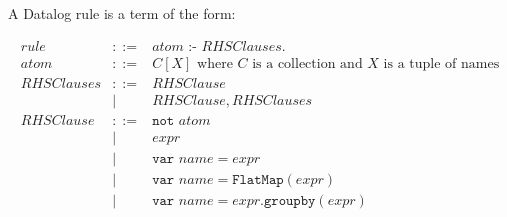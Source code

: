 \documentclass[10pt]{article}
\newcommand{\code}[1]{\texttt{#1}}
\begin{document}
A Datalog rule is a term of the form:

\begin{eqnarray*}
  rule &::=& atom \code{ :- } \mathit{RHSClauses}. \\
  atom &::=& C[X] \mbox{ where $C$ is a collection and $X$ is a tuple
    of names} \\
  \mathit{RHSClauses} &::=& \mathit{RHSClause} \\
  &|& \mathit{RHSClause}, \mathit{RHSClauses} \\
  \mathit{RHSClause} &::=& \code{not } atom \\
  &|& expr   \\
  &|& \code{var } name = expr \\
  &|& \code{var } name = \code{FlatMap}( expr ) \\
  &|& \code{var } name = expr \code{.groupby}( expr ) \\
\end{eqnarray*}
\end{document}
